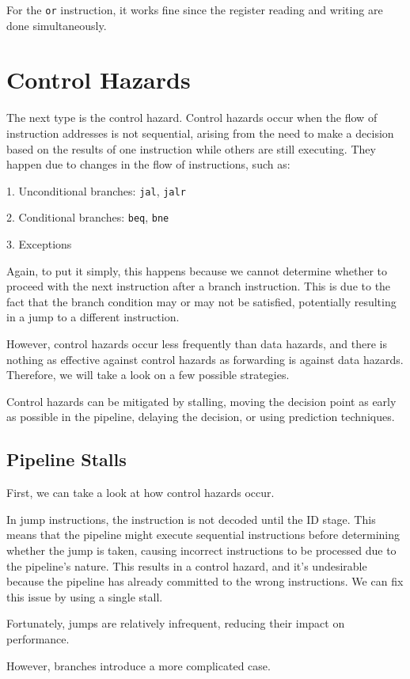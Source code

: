 For the \verb|or| instruction, it works fine since the register reading and writing are done simultaneously.

\section{Control Hazards}
The next type is the control hazard. Control hazards occur when the flow of instruction addresses is not sequential, arising from the need to make a decision based on the results of one instruction while others are still executing. They happen due to changes in the flow of instructions, such as:

1. Unconditional branches: \verb|jal|, \verb|jalr|

2. Conditional branches: \verb|beq|, \verb|bne|

3. Exceptions

Again, to put it simply, this happens because we cannot determine whether to proceed with the next instruction after a branch instruction. This is due to the fact that the branch condition may or may not be satisfied, potentially resulting in a jump to a different instruction.

However, control hazards occur less frequently than data hazards, and there is nothing as effective against control hazards as forwarding is against data hazards. Therefore, we will take a look on a few possible strategies. 

Control hazards can be mitigated by stalling, moving the decision point as early as possible in the pipeline, delaying the decision, or using prediction techniques.

\subsection{Pipeline Stalls}
First, we can take a look at how control hazards occur.

In jump instructions, the instruction is not decoded until the ID stage. This means that the pipeline might execute sequential instructions before determining whether the jump is taken, causing incorrect instructions to be processed due to the pipeline's nature. This results in a control hazard, and it's undesirable because the pipeline has already committed to the wrong instructions. We can fix this issue by using a single stall. 

Fortunately, jumps are relatively infrequent, reducing their impact on performance.

However, branches introduce a more complicated case.

